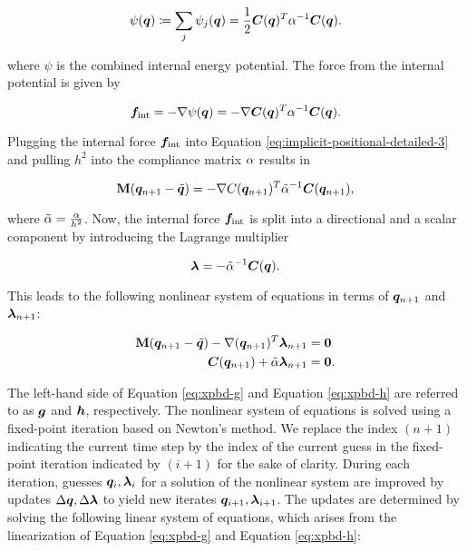 \begin{equation}\label{eq:xpbd-potential}
    \psi(\bm{q}) \coloneqq \sum_j \psi_j(\bm{q}) = \frac{1}{2}\bm{C}(\bm{q})^T \mathbf{\alpha}^{-1} \bm{C}(\bm{q}).
\end{equation}

\noindent where $\psi$ is the combined internal energy potential. The force from the internal potential is given by

\begin{equation}\label{eq:xpbd-internal-force}
    \bm{f}_{\text{int}} = -\nabla \psi(\bm{q}) = -\nabla \bm{C}(\bm{q})^T \mathbf{\alpha}^{-1} \bm{C}(\bm{q}).
\end{equation}

\noindent Plugging the internal force $\bm{f}_{\text{int}}$ into Equation \ref{eq:implicit-positional-detailed-3} and pulling $h^2$ into the 
compliance matrix $\mathbf{\alpha}$ results in

\[
    \mathbf{M}(\bm{q}_{n+1} - \tilde{\bm{q}}) = - \nabla C(\bm{q}_{n+1})^T \tilde{\mathbf{\alpha}}^{-1} \bm{C}(\bm{q}_{n+1}),
\]

\noindent where $\tilde{\mathbf{\alpha}} = \frac{\mathbf{\alpha}}{h^2}$. Now, the internal force $\bm{f}_{\text{int}}$ is split into a directional 
and a scalar component by introducing the Lagrange multiplier

\begin{equation}\label{eq:lagrange-multiplier}
    \bm{\lambda} = -\tilde{\mathbf{\alpha}}^{-1}\bm{C}(\bm{q}).
\end{equation}

\noindent This leads to the following nonlinear system of equations in terms of $\bm{q}_{n+1}$ and $\bm{\lambda}_{n+1}$:

\begin{align}
    \mathbf{M}(\bm{q}_{n+1} - \tilde{\bm{q}}) - \nabla (\bm{q}_{n+1})^T \bm{\lambda}_{n+1} &= \bm{0} \label{eq:xpbd-g} \\
    \bm{C}(\bm{q}_{n+1}) + \tilde{\mathbf{\alpha}}\bm{\lambda}_{n+1} &= \bm{0} \label{eq:xpbd-h}.
\end{align}

\noindent The left-hand side of Equation \ref{eq:xpbd-g} and Equation \ref{eq:xpbd-h} are referred to as $\bm{g}$ and $\bm{h}$, respectively. The nonlinear 
system of equations is solved using a fixed-point iteration based on Newton's method. We replace the index $(n+1)$ indicating the current
time step by the index of the current guess in the fixed-point iteration indicated by $(i+1)$ for the sake of clarity. During each iteration, 
guesses $\bm{q}_i, \bm{\lambda}_i$ for a solution of the nonlinear system are improved by updates $\Delta \bm{q}, \Delta \bm{\lambda}$ to 
yield new iterates $\bm{q}_{i+1}, \bm{\lambda}_{i+1}$. The updates are determined by solving the following linear system of equations, 
which arises from the linearization of Equation \ref{eq:xpbd-g} and Equation \ref{eq:xpbd-h}:

